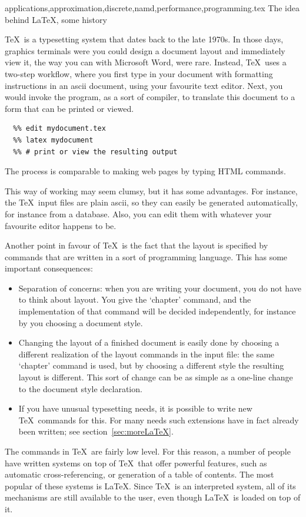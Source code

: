 {applications,approximation,discrete,namd,performance,programming}.tex {The idea behind \LaTeX, some history}

\TeX\ is a typesetting system that dates back to the late 1970s. In
those days, graphics terminals were you could design a document layout
and immediately view it, the way you can with Microsoft Word, were
rare.  Instead, \TeX\ uses a two-step workflow, where you first type
in your document with formatting instructions in an ascii document,
using your favourite text editor.
%
Next, you would invoke the
 program, as a sort of compiler, to translate this document to
a form that can be printed or viewed. 
\begin{verbatim}
  %% edit mydocument.tex
  %% latex mydocument
  %% # print or view the resulting output
\end{verbatim}
The process is comparable to
making web pages by typing HTML commands.

This way of working may seem clumsy, but
it has some advantages. For instance, the \TeX\ input files are plain
ascii, so they can easily be generated automatically, for instance
from a database. Also, you can edit them with whatever your
favourite editor happens to be.

Another point in favour of \TeX\ is the fact that the layout is
specified by commands that are written in a sort of programming
language. This has some important consequences:
\begin{itemize}
\item Separation of concerns: when you are writing your document, you
  do not have to think about layout. You give the `chapter' command,
  and the implementation of that command will be decided
  independently, for instance by you choosing a document style.
\item Changing the layout of a finished document is easily done by
  choosing a different realization of the layout commands in the input file:
  the same `chapter' command is used, but by choosing a different
  style the resulting layout is
  different. This sort of change can be as simple as 
  a one-line change to the document style declaration.
\item If you have unusual typesetting needs, it is possible to write
  new \TeX\ commands for this. For many needs such extensions have in
  fact already been written; see section~\ref{sec:moreLaTeX}.
\end{itemize}

The commands in \TeX\ are fairly low level. For this reason, a number
of people have written systems on top of \TeX\ that offer powerful
features, such as automatic cross-referencing, or generation of a
table of contents. The most popular of these systems is \LaTeX. Since
\TeX\ is an interpreted system, all of its mechanisms are still
available to the user, even though \LaTeX\ is loaded on top of it.

